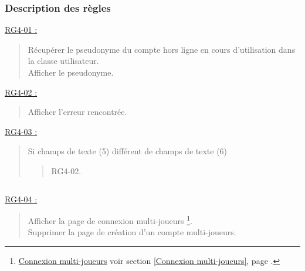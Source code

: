 \documentclass{report}
\begin{document}
		\subsubsection{Description des règles}

			\underline{RG4-01 :}
				\begin{quote}
					Récupérer le pseudonyme du compte hors ligne en cours d'utilisation dans la classe utilisateur.\\
					Afficher le pseudonyme.\\
				\end{quote}


			\underline{RG4-02 :}
				\begin{quote}
					Afficher l'erreur rencontrée.\\
				\end{quote}

				
			\underline{RG4-03 :}
				\begin{quote}
					Si champs de texte (5) différent de champs de texte (6)
					\begin{quote}
						RG4-02.
					\end{quote}
				\end{quote}

			$\,$				
				
			\underline{RG4-04 :}
				\begin{quote}
					Afficher la page de connexion multi-joueurs%
						\footnote[1]{
							\hyperlink{Connexion multi-joueurs}{Connexion multi-joueurs}
							\og voir section \ref{Connexion multi-joueurs}, page \pageref{Connexion multi-joueurs}.\fg
						}.\\
					Supprimer la page de création d'un compte multi-joueurs.\\
				\end{quote}
\end{document}

